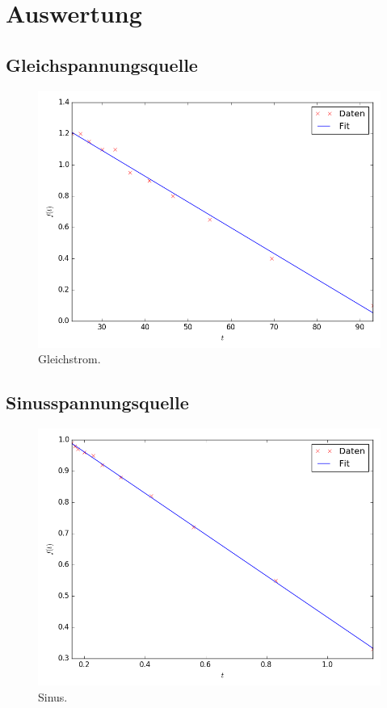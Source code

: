 \section{Auswertung}
\label{sec:Auswertung}

\subsection{Gleichspannungsquelle}
\begin{figure}
	\centering
	\includegraphics[width=\linewidth,height=\textheight,keepaspectratio]{Gleichstrom.png}
	\caption{Gleichstrom.}
	\label{fig:Gleichstrom}
\end{figure}





\subsection{Sinusspannungsquelle}

\begin{figure}
  \centering
  \includegraphics[width=\linewidth,height=\textheight,keepaspectratio]{Sinus.png}
  \caption{Sinus.}
  \label{fig:Sinus}
\end{figure}


